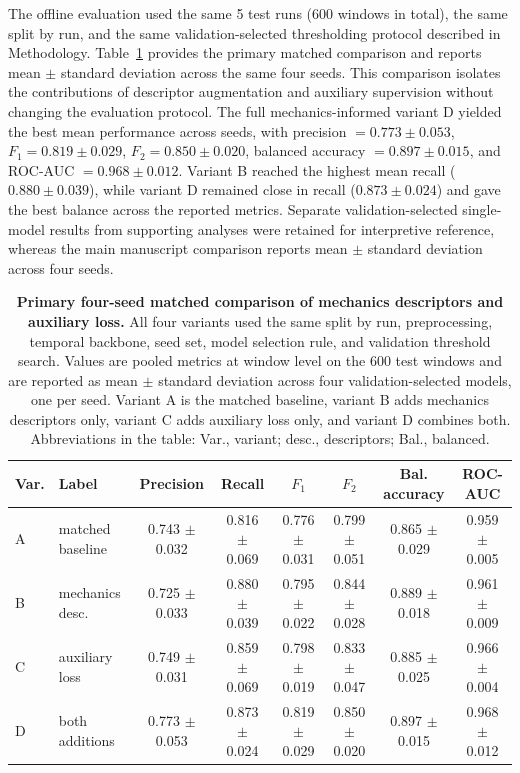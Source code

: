 \documentclass[fleqn,10pt]{wlscirep}
\begin{document}
The offline evaluation used the same 5 test runs (600 windows in total), the same split by run, and the same validation-selected thresholding protocol described in Methodology. Table~\ref{tab:overall_performance} provides the primary matched comparison and reports mean $\pm$ standard deviation across the same four seeds. This comparison isolates the contributions of descriptor augmentation and auxiliary supervision without changing the evaluation protocol. The full mechanics-informed variant D yielded the best mean performance across seeds, with precision $= 0.773 \pm 0.053$, $F_1 = 0.819 \pm 0.029$, $F_2 = 0.850 \pm 0.020$, balanced accuracy $= 0.897 \pm 0.015$, and ROC-AUC $= 0.968 \pm 0.012$. Variant B reached the highest mean recall ($0.880 \pm 0.039$), while variant D remained close in recall ($0.873 \pm 0.024$) and gave the best balance across the reported metrics. Separate validation-selected single-model results from supporting analyses were retained for interpretive reference, whereas the main manuscript comparison reports mean $\pm$ standard deviation across four seeds.

\begin{table}[htbp]
\centering
\caption{\textbf{Primary four-seed matched comparison of mechanics descriptors and auxiliary loss.} All four variants used the same split by run, preprocessing, temporal backbone, seed set, model selection rule, and validation threshold search. Values are pooled metrics at window level on the 600 test windows and are reported as mean $\pm$ standard deviation across four validation-selected models, one per seed. Variant A is the matched baseline, variant B adds mechanics descriptors only, variant C adds auxiliary loss only, and variant D combines both. Abbreviations in the table: Var., variant; desc., descriptors; Bal., balanced.}
\label{tab:overall_performance}
\small
\begin{tabular}{llcccccc}
\hline
Var. & Label & Precision & Recall & $F_1$ & $F_2$ & Bal. accuracy & ROC-AUC \\
\hline
A & matched baseline & 0.743 $\pm$ 0.032 & 0.816 $\pm$ 0.069 & 0.776 $\pm$ 0.031 & 0.799 $\pm$ 0.051 & 0.865 $\pm$ 0.029 & 0.959 $\pm$ 0.005 \\
B & mechanics desc. & 0.725 $\pm$ 0.033 & 0.880 $\pm$ 0.039 & 0.795 $\pm$ 0.022 & 0.844 $\pm$ 0.028 & 0.889 $\pm$ 0.018 & 0.961 $\pm$ 0.009 \\
C & auxiliary loss & 0.749 $\pm$ 0.031 & 0.859 $\pm$ 0.069 & 0.798 $\pm$ 0.019 & 0.833 $\pm$ 0.047 & 0.885 $\pm$ 0.025 & 0.966 $\pm$ 0.004 \\
D & both additions & 0.773 $\pm$ 0.053 & 0.873 $\pm$ 0.024 & 0.819 $\pm$ 0.029 & 0.850 $\pm$ 0.020 & 0.897 $\pm$ 0.015 & 0.968 $\pm$ 0.012 \\
\hline
\end{tabular}
\end{table}
\end{document}
